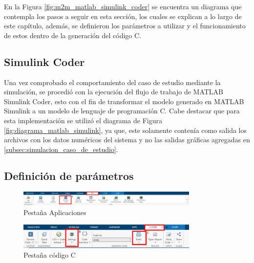En la Figura \ref{fig:m2m_matlab_simulink_coder} se encuentra un diagrama que contempla los pasos a seguir en esta sección, los cuales se explican a lo largo de este capítulo, además, se definieron los parámetros a utilizar y el funcionamiento de estos dentro de la generación del código C.

\subsection{Simulink Coder}\label{subsec:simulink_coder}

Una vez comprobado el comportamiento del caso de estudio mediante la simulación, se procedió con la ejecución del flujo de trabajo de MATLAB Simulink Coder, esto con el fin de transformar el modelo generado en MATLAB Simulink a un modelo de lenguaje de programación C. Cabe destacar que para esta implementación se utilizó el diagrama de Figura \ref{fig:diagrama_matlab_simulink}, ya que, este solamente contenía como salida los archivos con los datos numéricos del sistema y no las salidas gráficas agregadas en \ref{subsec:simulacion_caso_de_estudio}.


\subsection{Definición de parámetros}

\begin{figure}[h!]
    \centering
    \includegraphics[width=0.8\textwidth]{fig/especifico_2/M2MT/paso_a_paso_mtmt/apps.pdf}
    \caption{Pestaña Aplicaciones}
    \label{fig:pestana_apps}
\end{figure}

\begin{figure}[h!]
    \centering
    \includegraphics[width=0.8\textwidth]{fig/especifico_2/M2MT/paso_a_paso_mtmt/c_code.pdf}
    \caption{Pestaña código C}
    \label{fig:pestana_c_code}
\end{figure}


